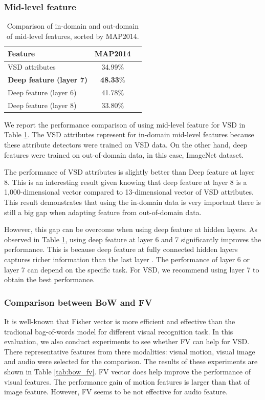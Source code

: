 \documentclass[twocolumn]{bmcart}%
\begin{document}
\subsubsection{Mid-level feature}
\begin{table}
	\centering
	\caption{Comparison of in-domain and out-domain of mid-level features, sorted by MAP2014.}
	\begin{tabular}{lcc}
		\hline
		Feature & MAP2014 \\ \hline
		VSD	attributes & 34.99\% \\ \hline
		\textbf{Deep feature (layer 7)} &\textbf{ 48.33}\% \\
		Deep feature (layer 6) & 41.78\% \\
		Deep feature (layer 8) & 33.80\% \\ \hline
	\end{tabular}%
	\label{tab:midlevel}%
\end{table}%
We report the performance comparison of using mid-level feature for VSD in Table \ref{tab:midlevel}. The VSD attributes represent for in-domain mid-level features because these attribute detectors were trained on VSD data. On the other hand, deep features were trained on out-of-domain data, in this case, ImageNet dataset.

The performance of VSD attributes is slightly better than Deep feature at layer 8. This is an interesting result given knowing that deep feature at layer 8 is a 1,000-dimensional vector compared to 13-dimensional vector of VSD attributes. This result demonstrates that using the in-domain data is very important there is still a big gap when adapting feature from out-of-domain data.

However, this gap can be overcome when using deep feature at hidden layers. As observed in Table \ref{tab:midlevel}, using deep feature at layer 6 and 7 significantly improves the performance. This is because deep feature at fully connected hidden layers captures richer information than the last layer \cite{donahue2013decaf}. The performance of layer 6 or layer 7 can depend on the specific task. For VSD, we recommend using layer 7 to obtain the best performance.

\subsubsection{Comparison between BoW and FV}
It is well-known that Fisher vector is more efficient and effective than the tradional bag-of-words model for different visual recognition task. In this evaluation, we also conduct experiments to see whether FV can help for VSD. There representative features from there modalities: visual motion, visual image and audio were selected for the comparison. The results of these experiments are shown in Table \ref{tab:bow_fv}. FV vector does help improve the performance of visual features. The performance gain of motion features is larger than that of image feature. However, FV seems to be not effective for audio feature.
\end{document}
